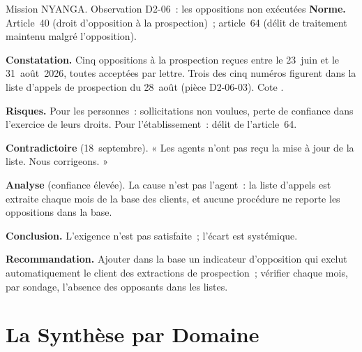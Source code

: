 \begin{boxscenario}{Mission NYANGA. Observation D2-06~: les oppositions non exécutées}
\textbf{Norme.} Article~40 (droit d'opposition à la prospection)~;
article~64 (délit de traitement maintenu malgré l'opposition).

\textbf{Constatation.} Cinq oppositions à la prospection reçues entre le
23~juin et le 31~août~2026, toutes acceptées par lettre. Trois des cinq
numéros figurent dans la liste d'appels de prospection du 28~août (pièce
D2-06-03). Cote \NON{}.

\textbf{Risques.} Pour les personnes~: sollicitations non voulues, perte de
confiance dans l'exercice de leurs droits. Pour l'établissement~: délit de
l'article~64.

\textbf{Contradictoire} (18~septembre). « Les agents n'ont pas reçu la mise
à jour de la liste. Nous corrigeons. »

\textbf{Analyse} (confiance élevée). La cause n'est pas l'agent~: la liste
d'appels est extraite chaque mois de la base des clients, et aucune
procédure ne reporte les oppositions dans la base.

\textbf{Conclusion.} L'exigence n'est pas satisfaite~; l'écart est
systémique.

\textbf{Recommandation.} Ajouter dans la base un indicateur d'opposition
qui exclut automatiquement le client des extractions de prospection~;
vérifier chaque mois, par sondage, l'absence des opposants dans les listes.
\end{boxscenario}

\section{La Synthèse par Domaine}
\label{sec:c13-synthese}

